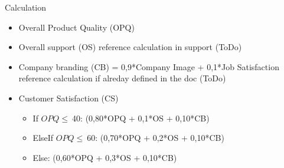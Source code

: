 \documentclass[11pt,titlepage,oneside,openany]{book}
\begin{document}
Calculation
\begin{itemize}
    \item Overall Product Quality (OPQ)
    \item Overall support (OS) reference calculation in support (ToDo)
    \item Company branding (CB) = 0,9*Company Image + 0,1*Job Satisfaction reference calculation if alreday defined in the doc (ToDo)
    \item Customer Satisfaction (CS)
    \begin{itemize}
    \item If $OPQ \leq \ $40: (0,80*OPQ + 0,1*OS + 0,10*CB)
    \item ElseIf $OPQ \leq \ $60: (0,70*OPQ + 0,2*OS + 0,10*CB)
    \item Else: (0,60*OPQ + 0,3*OS + 0,10*CB)
    \end{itemize}
\end{itemize}
\end{document}
